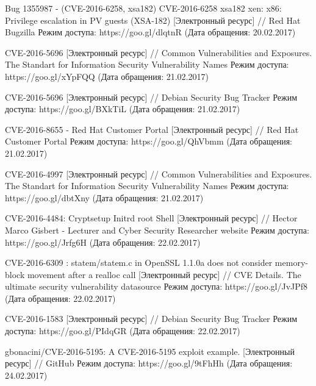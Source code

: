 \begin{thebibliography}{00}
    Bug 1355987 - (CVE-2016-6258, xsa182) CVE-2016-6258 xsa182 xen: x86: Privilege escalation in PV guests (XSA-182)
    [Электронный ресурс] //
    Red Hat Bugzilla
    Режим доступа: https://goo.gl/dlqtnR
    (Дата обращения: 20.02.2017)

    CVE-2016-5696
    [Электронный ресурс] //
    Common Vulnerabilities and Exposures. The Standart for Information Security Vulnerability Names
    Режим доступа: https://goo.gl/xYpFQQ
    (Дата обращения: 21.02.2017)

    CVE-2016-5696
    [Электронный ресурс] //
    Debian Security Bug Tracker
    Режим доступа: https://goo.gl/BXkTiL
    (Дата обращения: 21.02.2017)

    CVE-2016-8655 - Red Hat Customer Portal
    [Электронный ресурс] //
    Red Hat Customer Portal
    Режим доступа: https://goo.gl/QhVbmm
    (Дата обращения: 21.02.2017)

    CVE-2016-4997
    [Электронный ресурс] //
    Common Vulnerabilities and Exposures. The Standart for Information Security Vulnerability Names
    Режим доступа: https://goo.gl/dbtXny
    (Дата обращения: 21.02.2017)

    CVE-2016-4484: Cryptsetup Initrd root Shell
    [Электронный ресурс] //
    Hector Marco Gisbert - Lecturer and Cyber Security Researcher website
    Режим доступа: https://goo.gl/Jrfg6H
    (Дата обращения: 22.02.2017)

    CVE-2016-6309 : statem/statem.c in OpenSSL 1.1.0a does not consider memory-block movement after a realloc call
    [Электронный ресурс] //
    CVE Details. The ultimate security vulnerability datasource
    Режим доступа: https://goo.gl/JvJPf8
    (Дата обращения: 22.02.2017)

    CVE-2016-1583
    [Электронный ресурс] //
    Debian Security Bug Tracker
    Режим доступа: https://goo.gl/PIdqGR
    (Дата обращения: 22.02.2017)

    gbonacini/CVE-2016-5195: A CVE-2016-5195 exploit example.
    [Электронный ресурс] //
    GitHub
    Режим доступа: https://goo.gl/9tFhHh
    (Дата обращения: 24.02.2017)

\end{thebibliography}
\endgroup

\clearpage
